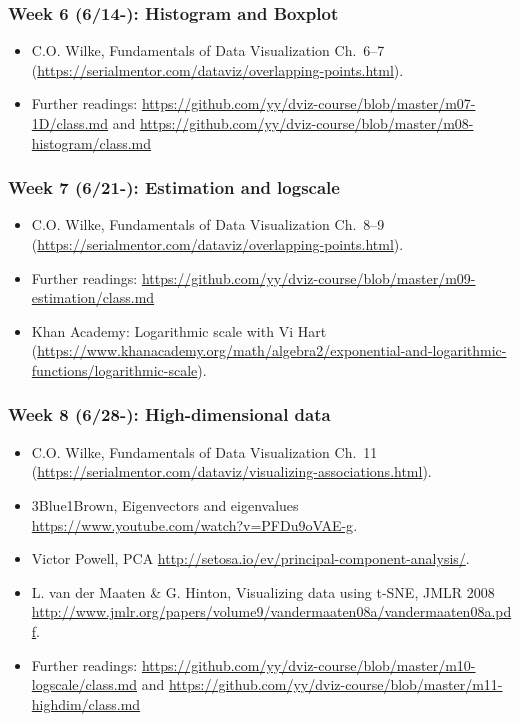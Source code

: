 \subsubsection{Week 6 (6/14-): Histogram and Boxplot }%

\begin{itemize}\itemsep0em 
\item C.O. Wilke, Fundamentals of Data Visualization Ch.~6--7 (\url{https://serialmentor.com/dataviz/overlapping-points.html}). 
\item Further readings: \url{https://github.com/yy/dviz-course/blob/master/m07-1D/class.md} and \url{https://github.com/yy/dviz-course/blob/master/m08-histogram/class.md}
\end{itemize}	
\subsubsection{Week 7 (6/21-): Estimation and logscale }%

\begin{itemize}\itemsep0em 
\item C.O. Wilke, Fundamentals of Data Visualization Ch.~8--9 (\url{https://serialmentor.com/dataviz/overlapping-points.html}). 
\item Further readings: \url{https://github.com/yy/dviz-course/blob/master/m09-estimation/class.md}
\item Khan Academy: Logarithmic scale with Vi Hart (\url{https://www.khanacademy.org/math/algebra2/exponential-and-logarithmic-functions/logarithmic-scale}). 
\end{itemize}	
\subsubsection{Week 8 (6/28-): High-dimensional data }%

\begin{itemize}\itemsep0em 
\item C.O. Wilke, Fundamentals of Data Visualization Ch.~11 (\url{https://serialmentor.com/dataviz/visualizing-associations.html}). 
\item 3Blue1Brown, Eigenvectors and eigenvalues \url{https://www.youtube.com/watch?v=PFDu9oVAE-g}. 
\item Victor Powell, PCA \url{http://setosa.io/ev/principal-component-analysis/}.
\item L. van der Maaten \& G. Hinton, Visualizing data using t-SNE, JMLR 2008 \url{http://www.jmlr.org/papers/volume9/vandermaaten08a/vandermaaten08a.pdf}.
\item Further readings: \url{https://github.com/yy/dviz-course/blob/master/m10-logscale/class.md} and \url{https://github.com/yy/dviz-course/blob/master/m11-highdim/class.md}
\end{itemize}	

